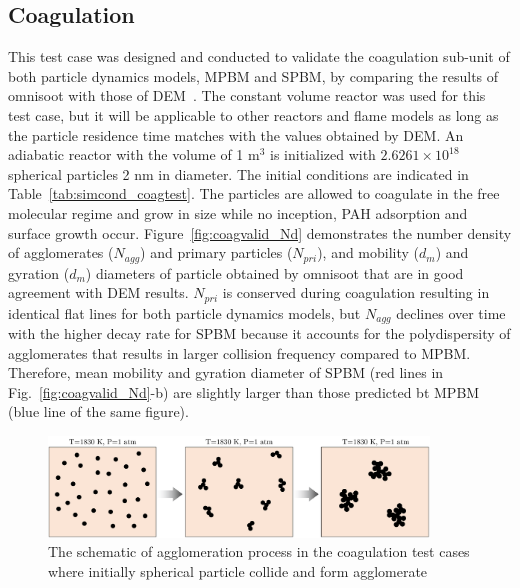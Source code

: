 \subsection{Coagulation}
This test case was designed and conducted to validate the coagulation sub-unit of both particle dynamics models, MPBM and SPBM, by comparing the results of omnisoot with those of DEM~\citep{kholghy2021surface}. The constant volume reactor was used for this test case, but it will be applicable to other reactors and flame models as long as the particle residence time matches with the values obtained by DEM. An adiabatic reactor with the volume of 1 $\mathrm{m^3}$ is initialized with $2.6261\times10^{18}$ spherical particles 2 nm in diameter. The initial conditions are indicated in Table~\ref{tab:simcond_coagtest}. The particles are allowed to coagulate in the free molecular regime and grow in size while no inception, PAH adsorption and surface growth occur. Figure~\ref{fig:coagvalid_Nd} demonstrates the number density of agglomerates (${N_{agg}}$) and primary particles (${N_{pri}}$), and mobility (${d_m}$) and gyration (${d_m}$) diameters of particle obtained by omnisoot that are in good agreement with DEM results. ${N_{pri}}$ is conserved during coagulation resulting in identical flat lines for both particle dynamics models, but ${N_{agg}}$ declines over time with the higher decay rate for SPBM because it accounts for the polydispersity of agglomerates that results in larger collision frequency compared to MPBM. Therefore, mean mobility and gyration diameter  of SPBM (red lines in Fig.~\ref{fig:coagvalid_Nd}-b) are slightly larger than those predicted bt MPBM (blue line of the same figure).

\begin{figure}[H]
	\centering
	\includegraphics[width=0.9\textwidth]{Figures/Results/Validation/Coagulation/coagulation_scheme.pdf}
	\caption{The schematic of agglomeration process in the coagulation test cases where initially spherical particle collide and form agglomerate}
	\label{fig:coagscheme}
\end{figure}

